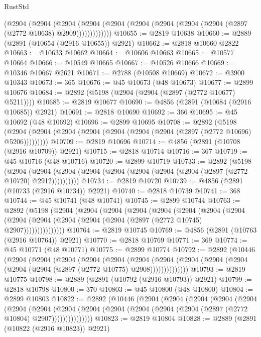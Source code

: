 \begin{lexlean}{RustStd}
\begin{coremodule}
          (@2904
            (@2904
              (@2904
                (@2904 (@2904 (@2904 (@2904 (@2904 (@2904 (@2897 (@2772 @10638) @2909)))))))))))))
@10655 := @2819 @10638
@10660 := @2889 (@2891 (@10654 (@2916 @10655)) @2921)
@10662 := @2818 @10660 @2822
@10663 := @10633 @10662
@10664 := @10606 @10663
@10665 := @10577 @10664
@10666 := @10549 @10665
@10667 := @10526 @10666
@10669 := @10346 @10667 @2621
@10671 := @2788 (@10508 @10669)
@10672 := @3900 @10343
@10673 := 365
@10676 := @45 @10673 (@48 @10673)
@10677 := @2899 @10676
@10684 := @2892 (@5198 (@2904 (@2904 (@2897 (@2772 @10677) @5211))))
@10685 := @2819 @10677
@10690 := @4856 (@2891 (@10684 (@2916 @10685)) @2921)
@10691 := @2818 @10690
@10692 := 366
@10695 := @45 @10692 (@48 @10692)
@10696 := @2899 @10695
@10708 := @2892
    (@5198 (@2904 (@2904 (@2904 (@2904 (@2904 (@2904 (@2904 (@2897 (@2772 @10696) @5206)))))))))
@10709 := @2819 @10696
@10714 := @4856 (@2891 (@10708 (@2916 @10709)) @2921)
@10715 := @2818 @10714
@10716 := 367
@10719 := @45 @10716 (@48 @10716)
@10720 := @2899 @10719
@10733 := @2892
    (@5198
      (@2904 (@2904 (@2904 (@2904 (@2904 (@2904 (@2904 (@2904 (@2897 (@2772 @10720) @2912))))))))))
@10734 := @2819 @10720
@10739 := @4856 (@2891 (@10733 (@2916 @10734)) @2921)
@10740 := @2818 @10739
@10741 := 368
@10744 := @45 @10741 (@48 @10741)
@10745 := @2899 @10744
@10763 := @2892
    (@5198
      (@2904
        (@2904
          (@2904
            (@2904
              (@2904
                (@2904
                  (@2904
                    (@2904
                      (@2904 (@2904 (@2904 (@2904 (@2904 (@2897 (@2772 @10745) @2907)))))))))))))))
@10764 := @2819 @10745
@10769 := @4856 (@2891 (@10763 (@2916 @10764)) @2921)
@10770 := @2818 @10769
@10771 := 369
@10774 := @45 @10771 (@48 @10771)
@10775 := @2899 @10774
@10792 := @2892
    (@10446
      (@2904
        (@2904
          (@2904
            (@2904
              (@2904
                (@2904
                  (@2904
                    (@2904 (@2904 (@2904 (@2904 (@2904 (@2897 (@2772 @10775) @2908))))))))))))))
@10793 := @2819 @10775
@10798 := @2889 (@2891 (@10792 (@2916 @10793)) @2921)
@10799 := @2818 @10798
@10800 := 370
@10803 := @45 @10800 (@48 @10800)
@10804 := @2899 @10803
@10822 := @2892
    (@10446
      (@2904
        (@2904
          (@2904
            (@2904
              (@2904
                (@2904
                  (@2904
                    (@2904
                      (@2904 (@2904 (@2904 (@2904 (@2904 (@2897 (@2772 @10804) @2907)))))))))))))))
@10823 := @2819 @10804
@10828 := @2889 (@2891 (@10822 (@2916 @10823)) @2921)

\end{coremodule}
\end{lexlean}
